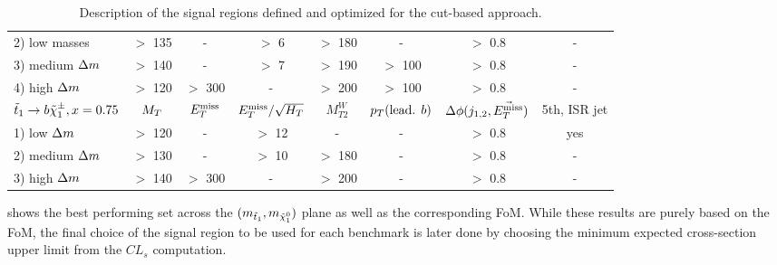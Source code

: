 \begin{table}[!ht]
{\begin{center}
\begin{tabular}{|l|ccccccc|}
    2) low masses       &  $>$ 135  &   -      &  $>$  6         & $>$ 180    & -                     &  $>$ 0.8      & -             \\
    3) medium $\Delta m$ &  $>$ 140  &   -      &  $>$  7         & $>$ 190    & $>$ 100               &  $>$ 0.8      & -             \\
    4) high   $\Delta m$ &  $>$ 120  & $>$ 300  &   -             & $>$ 200    & $>$ 100               &  $>$ 0.8      & -             \\
    \hline
    $\tilde{t}_1 \rightarrow b\tilde{\chi}_1^\pm, x=0.75$   & $M_T$     & $E_T^\text{miss}$    & $E_T^\text{miss}/\sqrt{H_T}$ & $M_{T2}^W$ & $p_T(\text{lead. }b)$ & $\Delta\phi(j_{1,2},\vec{E_T^\text{miss}})$ & 5th, ISR jet  \\
    \hline
    1) low    $\Delta m$ &  $>$ 120  &   -      &  $>$  12        &     -      &      -                &  $>$ 0.8      & yes           \\
    2) medium $\Delta m$ &  $>$ 130  &   -      &  $>$  10        &  $>$ 180   &      -                &  $>$ 0.8      & -             \\
    3) high   $\Delta m$ &  $>$ 140  & $>$ 300  &    -            &  $>$ 200   &      -                &  $>$ 0.8      & -             \\
    \hline
    \end{tabular}
\caption{Description of the signal regions defined and optimized for the cut-based approach. \label{tab:cutAndCountCuts}}
\end{center}}
\end{table}

     shows the best performing set across
    the $(m_{\tilde{t}_1},m_{\tilde{\chi}_1^0})$ plane as well as the corresponding
    FoM. While these results are purely based on the FoM, the final choice of
    the signal region to be used for each benchmark is later done by choosing
    the minimum expected cross-section upper limit from the $CL_s$ computation.

